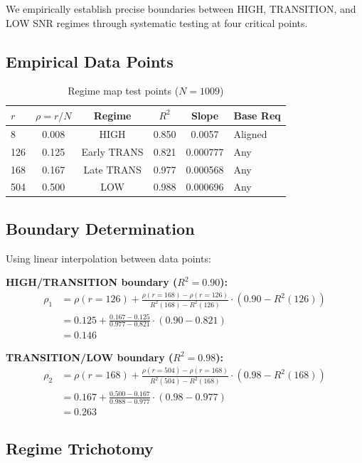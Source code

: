 We empirically establish precise boundaries between HIGH, TRANSITION, and LOW SNR regimes through systematic testing at four critical points.

\subsection{Empirical Data Points}

\begin{table}[h]
\centering
\begin{tabular}{@{}lccccl@{}}
\toprule
$r$ & $\rho = r/N$ & Regime & $R^2$ & Slope & Base Req \\
\midrule
8 & 0.008 & HIGH & 0.850 & 0.0057 & Aligned \\
126 & 0.125 & Early TRANS & 0.821 & 0.000777 & Any \\
168 & 0.167 & Late TRANS & 0.977 & 0.000568 & Any \\
504 & 0.500 & LOW & 0.988 & 0.000696 & Any \\
\bottomrule
\end{tabular}
\caption{Regime map test points ($N=1009$)}
\end{table}

\subsection{Boundary Determination}

Using linear interpolation between data points:

\textbf{HIGH/TRANSITION boundary ($R^2 = 0.90$):}
\begin{align}
\rho_1 &= \rho(r=126) + \frac{\rho(r=168) - \rho(r=126)}{R^2(168) - R^2(126)} \cdot (0.90 - R^2(126)) \\
&= 0.125 + \frac{0.167 - 0.125}{0.977 - 0.821} \cdot (0.90 - 0.821) \\
&= 0.146
\end{align}

\textbf{TRANSITION/LOW boundary ($R^2 = 0.98$):}
\begin{align}
\rho_2 &= \rho(r=168) + \frac{\rho(r=504) - \rho(r=168)}{R^2(504) - R^2(168)} \cdot (0.98 - R^2(168)) \\
&= 0.167 + \frac{0.500 - 0.167}{0.988 - 0.977} \cdot (0.98 - 0.977) \\
&= 0.263
\end{align}

\subsection{Regime Trichotomy}

